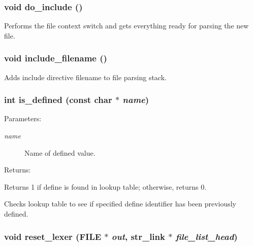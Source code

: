 \subsubsection{\setlength{\rightskip}{0pt plus 5cm}void do\_\-include ()\hspace{0.3cm}{\tt  [static]}}\label{lexer_8c_a148}


Performs the file context switch and gets everything ready for parsing the new file. 
\subsubsection{\setlength{\rightskip}{0pt plus 5cm}void include\_\-filename ()\hspace{0.3cm}{\tt  [static]}}\label{lexer_8c_a147}


Adds include directive filename to file parsing stack. 
\subsubsection{\setlength{\rightskip}{0pt plus 5cm}int is\_\-defined (const char $\ast$ {\em name})\hspace{0.3cm}{\tt  [static]}}\label{lexer_8c_a146}


\begin{Desc}
\item[Parameters: ]\par
\begin{description}
\item[{\em 
name}]Name of defined value. \end{description}
\end{Desc}
\begin{Desc}
\item[Returns: ]\par
Returns 1 if define is found in lookup table; otherwise, returns 0.\end{Desc}
Checks lookup table to see if specified define identifier has been previously defined. 
\subsubsection{\setlength{\rightskip}{0pt plus 5cm}void reset\_\-lexer (FILE $\ast$ {\em out}, {\bf str\_\-link} $\ast$ {\em file\_\-list\_\-head})}\label{lexer_8c_a154}


